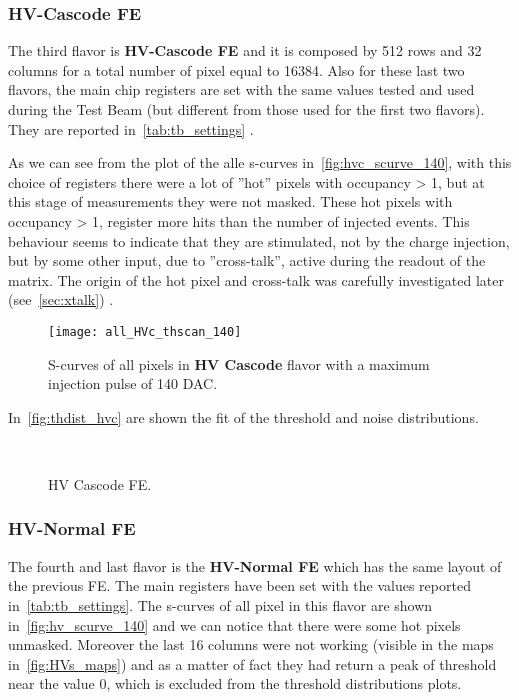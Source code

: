 \subsubsection{HV-Cascode FE}


The third flavor is \textbf{HV-Cascode FE} and it is composed by 512 rows and 32 columns for a total number of pixel equal to 16384. Also for these last two flavors, the main chip registers are set with the same values tested and used during the Test Beam (but different from those used for the first two flavors). They are reported in~\autoref{tab:tb_settings} .

As we can see from the plot of the alle s-curves in~\autoref{fig:hvc_scurve_140}, with this choice of registers there were a lot of ''hot'' pixels with occupancy > 1, but at this stage of measurements they were not masked.
These hot pixels with occupancy > 1, register more hits than the number of injected events. This behaviour seems to indicate that they are stimulated, not by the charge injection, but by some other input, due to ''cross-talk'', active during the readout of the matrix. The origin of the hot pixel and cross-talk was carefully investigated later (see~\autoref{sec:xtalk})
.

\begin{figure}[h!]
\centering
\texttt{[image: all\_HVc\_thscan\_140]}
\caption{S-curves of all pixels in \textbf{HV Cascode} flavor with a maximum injection pulse of 140 DAC.}
\label{fig:hvc_scurve_140}
\end{figure}

In~\autoref{fig:thdist_hvc} are shown the fit of the threshold and noise distributions.

\begin{figure}[h!]
\centering
{}\quad
{}\\
\caption{HV Cascode FE.}
\label{fig:thdist_hvc}
\end{figure}


\subsubsection{HV-Normal FE}\label{sec:first_xtalk}

The fourth and last flavor is the \textbf{HV-Normal FE} which has the same layout of the previous FE. The main registers have been set with the values reported in~\autoref{tab:tb_settings}.
The s-curves of all pixel in this flavor are shown in~\autoref{fig:hv_scurve_140} and we can notice that there were some hot pixels unmasked.
Moreover the last 16 columns were not working (visible in the maps in~\autoref{fig:HVs_maps}) and as a matter of fact they had return a peak of threshold near the value 0, which is excluded from the threshold distributions plots.

